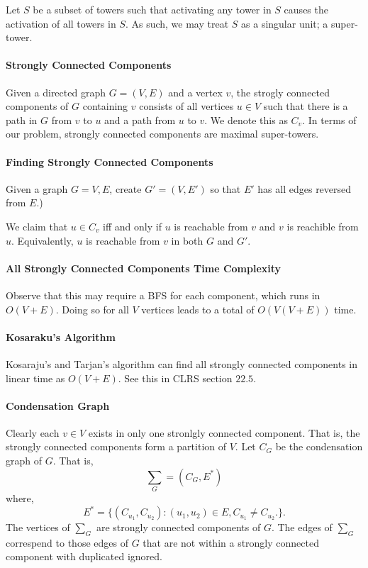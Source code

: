 Let \(S\) be a subset of towers such that activating any tower in \(S\)
causes the activation of all towers in \(S\). As such, we may treat \(S\) 
as a singular unit; a super-tower.

\paragraph{Strongly Connected Components}
Given a directed graph \(G = (V, E)\) and a vertex \(v\), the strogly connected
components of \(G\) containing \(v\) consists of all vertices
\(u \in  V\) such that there is a path in \(G\) from \(v\) to \(u\) and a path
from \(u\) to \(v\). We denote this as \(C_v\).
In terms of our problem, strongly connected components are maximal
super-towers.

\paragraph{Finding Strongly Connected Components}
Given a graph \(G = V, E\), create \(G' = (V, E')\) so that
\(E'\) has all edges reversed from \(E\).)

We claim that \(u \in C_v\) iff and only if \(u\) is reachable from \(v\)
and \(v\) is reachible from \(u\). Equivalently, \(u\) is reachable from
\(v\) in both \(G\) and \(G'\).

\paragraph{All Strongly Connected Components Time Complexity}
Observe that this may require a BFS for each component, which runs in
\(O(V + E)\). Doing so for all \(V\) vertices leads to a total of
 \(O(V(V+E))\) time.

\paragraph{Kosaraku's Algorithm}
Kosaraju's and Tarjan's algorithm can find all strongly connected components
in linear time as \(O(V+E)\). See this in CLRS section \(22.5\).

\paragraph{Condensation Graph}
Clearly each \(v \in  V\) exists in only one stronlgly connected component.
That is, the strongly connected components form a partition of \(V\).
Let \(C_G\) be the condensation graph of \(G\). That is, \[
    \sum_G = (C_G, E^*)
\] where,
\[
    E^* = \{
        (C_{u_1}, C_{u_2}) : (u_1, u_2) \in  E, C_{u_1} \neq C_{u_2}.
    \} 
.\]
The vertices of \(\sum_G\) are strongly connected components of \(G\).
The edges of \(\sum_G\) correspend to those edges of \(G\) that are not within
a strongly connected component with duplicated ignored.

